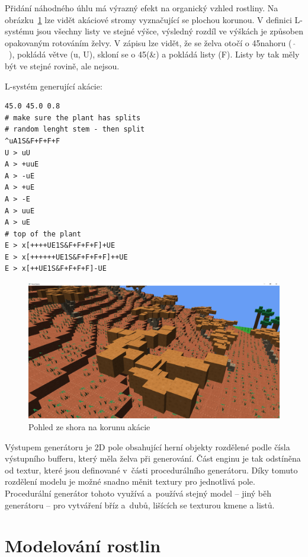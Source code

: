 \documentclass[thesis=M,czech]{FITthesis}[2019/12/23]
\begin{document}
Přidání náhodného úhlu má výrazný efekt na organický vzhled rostliny. Na obrázku~\ref{fig:acacia_random_angle_leaves} lze vidět akáciové stromy vyznačující se plochou korunou. V definici L-systému jsou všechny listy ve stejné výšce, výsledný rozdíl ve výškách je způsoben opakovaným rotováním želvy. V zápisu lze vidět, že se želva otočí o 45\degree nahoru (~$\hat{}$~), pokládá větve (u, U), skloní se o 45\degree (\&) a pokládá listy (F). Listy by tak měly být ve stejné rovině, ale nejsou.

L-systém generující akácie:

\begin{verbatim}
45.0 45.0 0.8
# make sure the plant has splits
# random lenght stem - then split
^uA1S&F+F+F+F
U > uU
A > +uuE
A > -uE
A > +uE
A > -E
A > uuE
A > uE
# top of the plant
E > x[++++UE1S&F+F+F+F]+UE
E > x[++++++UE1S&F+F+F+F]++UE
E > x[++UE1S&F+F+F+F]-UE
\end{verbatim}

\begin{figure}\centering
	\includegraphics[width=\textwidth]{images/acacia_random_angle_leaves}
	\caption[Pohled ze shora na korunu akácie]{Pohled ze shora na korunu akácie}\label{fig:acacia_random_angle_leaves}
\end{figure}

Výstupem generátoru je 2D pole obsahující herní objekty rozdělené podle čísla výstupního bufferu, který měla želva při generování. Část enginu je tak odstíněna od textur, které jsou definované v~části procedurálního generátoru. Díky tomuto rozdělení modelu je možné snadno měnit textury pro jednotlivá pole. Procedurální generátor tohoto využívá a~používá stejný model -- jiný běh generátoru -- pro vytváření bříz a~dubů, lišících se texturou kmene a listů.

\section{Modelování rostlin}
\end{document}

